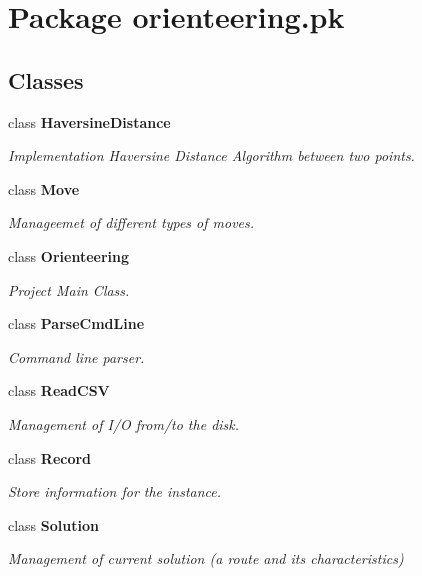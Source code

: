 \section{Package orienteering.\+pk}
\label{namespaceorienteering_1_1pk}
\subsection*{Classes}
\begin{DoxyCompactItemize}
\item 
class \textbf{ Haversine\+Distance}
\begin{DoxyCompactList}\small\item\em Implementation Haversine Distance Algorithm between two points. \end{DoxyCompactList}\item 
class {\bfseries Move}
\begin{DoxyCompactList}\small\item\em Manageemet of different types of moves. \end{DoxyCompactList}\item 
class \textbf{ Orienteering}
\begin{DoxyCompactList}\small\item\em Project Main Class. \end{DoxyCompactList}\item 
class {\bfseries Parse\+Cmd\+Line}
\begin{DoxyCompactList}\small\item\em Command line parser. \end{DoxyCompactList}\item 
class \textbf{ Read\+C\+SV}
\begin{DoxyCompactList}\small\item\em Management of I/O from/to the disk. \end{DoxyCompactList}\item 
class {\bfseries Record}
\begin{DoxyCompactList}\small\item\em Store information for the instance. \end{DoxyCompactList}\item 
class {\bfseries Solution}
\begin{DoxyCompactList}\small\item\em Management of current solution (a route and its characteristics) \end{DoxyCompactList}\end{DoxyCompactItemize}
